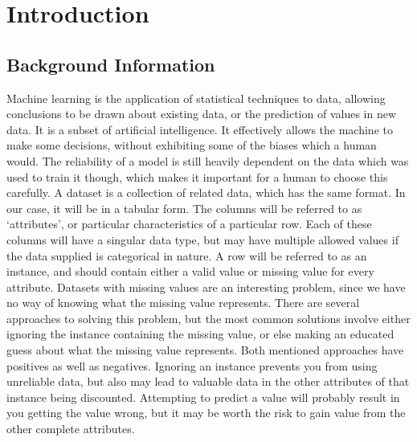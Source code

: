 \newpage
\chapter{Introduction}
\section{Background Information}
Machine learning is the application of statistical techniques to data, allowing conclusions to be drawn about existing data, or the prediction of values in new data. It is a subset of artificial intelligence. It effectively allows the machine to make some decisions, without exhibiting some of the biases which a human would. The reliability of a model is still heavily dependent on the data which was used to train it though, which makes it important for a human to choose this carefully.  A dataset is a collection of related data, which has the same format. In our case, it will be in a tabular form. The columns will be referred to as ‘attributes’, or particular characteristics of a particular row. Each of these columns will have a singular data type, but may have multiple allowed values if the data supplied is categorical in nature. A row will be referred to as an instance, and should contain either a valid value or missing value for every attribute.  Datasets with missing values are an interesting problem, since we have no way of knowing what the missing value represents. There are several approaches to solving this problem, but the most common solutions involve either ignoring the instance containing the missing value, or else making an educated guess about what the missing value represents. Both mentioned approaches have positives as well as negatives. Ignoring an instance prevents you from using unreliable data, but also may lead to valuable data in the other attributes of that instance being discounted. Attempting to predict a value will probably result in you getting the value wrong, but it may be worth the risk to gain value from the other complete attributes.

